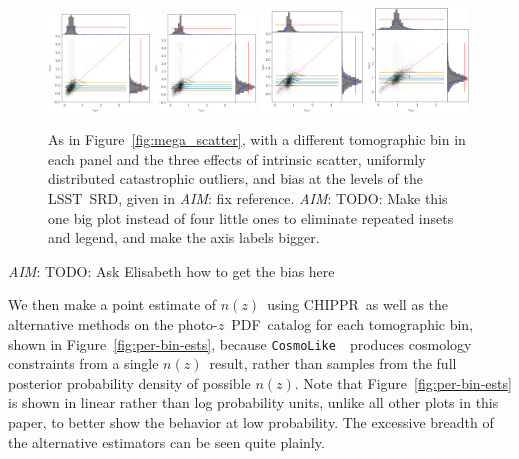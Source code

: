 \documentclass[iop]{emulateapj}
\newcommand{\todo}[3]{{\color{#2}\emph{#1}: #3}}
\newcommand{\aim}[1]{\todo{AIM}{red}{#1}}
\newcommand{\Fig}[1]{Figure~\ref{#1}}
\newcommand{\project}[1]{{\textsc{#1}}}
\newcommand{\lsst}{\project{LSST}}
\newcommand{\Chippr}{\project{CHIPPR}}
\newcommand{\repo}[1]{{\texttt{#1}}~}
\newcommand{\cosmolike}{\repo{CosmoLike}}
\newcommand{\nz}{$n(z)$}
\newcommand{\pz}{photo-$z$~}
\newcommand{\pzpdf}{\pz PDF}
\begin{document}
\begin{figure}
	\begin{center}
		\includegraphics[width=0.24\textwidth]{figures/chippr/0single_lsst_mega_scatter.png}
		\includegraphics[width=0.24\textwidth]{figures/chippr/1single_lsst_mega_scatter.png}
		\includegraphics[width=0.24\textwidth]{figures/chippr/2single_lsst_mega_scatter.png}
		\includegraphics[width=0.24\textwidth]{figures/chippr/3single_lsst_mega_scatter.png}
		\caption{As in \Fig{fig:mega_scatter}, with a different tomographic bin in each panel and the three effects of intrinsic scatter, uniformly distributed catastrophic outliers, and bias at the levels of the \lsst\ SRD, given in \aim{fix reference}.
		\aim{TODO: Make this one big plot instead of four little ones to eliminate repeated insets and legend, and make the axis labels bigger.}
		}
		\label{fig:per-bin-scatter}
	\end{center}
\end{figure}
 \aim{TODO: Ask Elisabeth how to get the bias here}

We then make a point estimate of \nz\ using \Chippr\ as well as the alternative methods on the \pzpdf\ catalog for each tomographic bin, shown in \Fig{fig:per-bin-ests}, because \cosmolike\ produces cosmology constraints from a single \nz\ result, rather than samples from the full posterior probability density of possible \nz.
Note that \Fig{fig:per-bin-ests} is shown in linear rather than log probability units, unlike all other plots in this paper, to better show the behavior at low probability.
The excessive breadth of the alternative estimators can be seen quite plainly.
\end{document}
